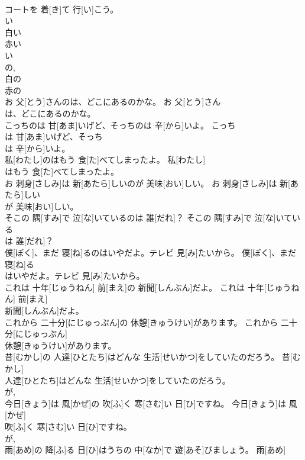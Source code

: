 \documentclass[8pt]{extreport}
\begin{document}
\begin{CJK}{UTF8}{min}
\\	コートを 着[き]て 行[い]こう。	
\\	い 
\\	白い 
\\	赤い 
\\	い 
\\	の, 
\\	白の 
\\	赤の
\\	お 父[とう]さんのは、どこにあるのかな。	お 父[とう]さん
\\	は、どこにあるのかな。	
\\	こっちのは 甘[あま]いげど、そっちのは 辛[から]いよ。	こっち
\\	は 甘[あま]いげど、そっち
\\	は 辛[から]いよ。	
\\	私[わたし]のはもう 食[た]べてしまったよ。	私[わたし]
\\	はもう 食[た]べてしまったよ。	
\\	お 刺身[さしみ]は 新[あたら]しいのが 美味[おい]しい。	お 刺身[さしみ]は 新[あたら]しい
\\	が 美味[おい]しい。	
\\	そこの 隅[すみ]で 泣[な]いているのは 誰[だれ]？	そこの 隅[すみ]で 泣[な]いている
\\	は 誰[だれ]？	
\\	僕[ぼく]、まだ 寝[ね]るのはいやだよ。テレビ 見[み]たいから。	僕[ぼく]、まだ 寝[ね]る
\\	はいやだよ。テレビ 見[み]たいから。	
\\	これは 十年[じゅうねん] 前[まえ]の 新聞[しんぶん]だよ。	これは 十年[じゅうねん] 前[まえ]
\\	新聞[しんぶん]だよ。	
\\	これから 二十分[にじゅっぷん]の 休憩[きゅうけい]があります。	これから 二十分[にじゅっぷん]
\\	休憩[きゅうけい]があります。	
\\	昔[むかし]の 人達[ひとたち]はどんな 生活[せいかつ]をしていたのだろう。	昔[むかし]
\\	人達[ひとたち]はどんな 生活[せいかつ]をしていたのだろう。	
\\	が, 
\\	今日[きょう]は 風[かぜ]の 吹[ふ]く 寒[さむ]い 日[ひ]ですね。	今日[きょう]は 風[かぜ]
\\	吹[ふ]く 寒[さむ]い 日[ひ]ですね。	
\\	が, 
\\	雨[あめ]の 降[ふ]る 日[ひ]はうちの 中[なか]で 遊[あそ]びましょう。	雨[あめ]

\end{CJK}
\end{document}
